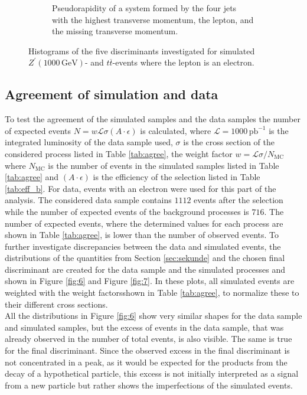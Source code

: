 \begin{figure}[H]
\begin{subfigure}{0.45\textwidth}
    \caption{Pseudorapidity of a system formed by the four jets with the highest transverse momentum, the lepton, and the missing transverse momentum.}%
    \label{fig:5e}%
  \end{subfigure}%
  \caption{Histograms of the five discriminants investigated for simulated $Z^\prime(1000 \, \si{\giga\eV})$- and $t \overline{t}$-events where the lepton
  is an electron.}%
  \label{fig:5}%
\end{figure}


\subsection{Agreement of simulation and data}
To test the agreement of the simulated samples and the data samples the number of expected events $N = w \mathcal{L} \sigma (A \cdot \epsilon)$ is calculated,
where $\mathcal{L} = 1000 \, \si{\pico\barn\tothe{-1}}$ is the integrated luminosity of the data sample used, $\sigma$ is the cross section of the considered
process listed in Table \ref{tab:agree}, the weight factor $w = \mathcal{L} \sigma / N_\text{MC}$ where $N_\text{MC}$ is the number of events in the
simulated samples listed in Table \ref{tab:agree} and $(A \cdot \epsilon)$ is the efficiency of the selection listed in Table \ref{tab:eff_b}.
For data, events with an electron were used for this part of the analysis.
The considered data sample contains $1112$ events after the selection while the number of expected events of the background processes is $716$.
The number of expected events, where the determined values for each process are shown in Table \ref{tab:agree}, is lower than the number of observed events.
To further investigate discrepancies between the data and simulated events, the distributions of the quantities from Section \ref{sec:sekunde} and the
chosen final discriminant are created for the data sample and the simulated processes and shown in Figure \ref{fig:6} and Figure \ref{fig:7}.
In these plots, all simulated events are weighted with the weight factorsshown in Table \ref{tab:agree}, to normalize these to their different cross
sections.\\
All the distributions in Figure \ref{fig:6} show very similar shapes for the data sample and simulated samples, but the excess of events in the
data sample, that was already observed in the number of total events, is also visible. The same is true for the final discriminant.
Since the observed excess in the final discriminant is not concentrated in a peak, as it would be expected for the products from the
decay of a hypothetical particle, this excess is not initially interpreted as a signal from a new particle but rather shows the imperfections
of the simulated events.

